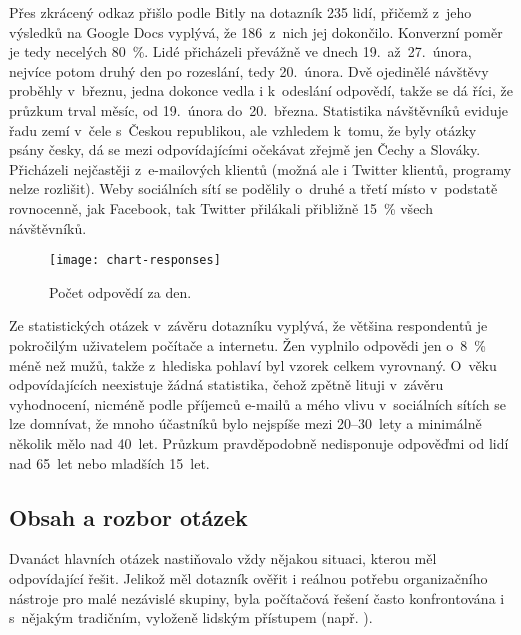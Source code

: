 \documentclass[12pt,oneside,final]{fithesis2}
\begin{document}
Přes zkrácený odkaz přišlo podle Bitly na dotazník 235 lidí, přičemž z~jeho výsledků na Google Docs vyplývá, že 186~z~nich jej dokončilo. Konverzní poměr je tedy necelých 80~\%. Lidé přicházeli převážně ve dnech 19.~až~27.~února, nejvíce potom druhý den po rozeslání, tedy 20.~února. Dvě ojedinělé návštěvy proběhly v~březnu, jedna dokonce vedla i k~odeslání odpovědí, takže se dá říci, že průzkum trval měsíc, od 19.~února do~20.~března. Statistika návštěvníků eviduje řadu zemí v~čele s~Českou republikou, ale vzhledem k~tomu, že byly otázky psány česky, dá se mezi odpovídajícími očekávat zřejmě jen Čechy a Slováky. Přicházeli nejčastěji z~e-mailových klientů (možná ale i Twitter klientů, programy nelze rozlišit). Weby sociálních sítí se podělily o~druhé a třetí místo v~podstatě rovnocenně, jak Facebook, tak Twitter přilákali přibližně 15~\% všech návštěvníků.

\begin{figure}[h]
    \centering
    \texttt{[image: chart-responses]}
    \caption{Počet odpovědí za den.}
\end{figure}

Ze statistických otázek v~závěru dotazníku vyplývá, že většina respondentů je pokročilým uživatelem počítače a internetu. Žen vyplnilo odpovědi jen o~8~\% méně než mužů, takže z~hlediska pohlaví byl vzorek celkem vyrovnaný. O~věku odpovídajících neexistuje žádná statistika, čehož zpětně lituji v~závěru vyhodnocení, nicméně podle příjemců e-mailů a mého vlivu v~sociálních sítích se lze domnívat, že mnoho účastníků bylo nejspíše mezi 20--30~lety a minimálně několik mělo nad 40~let. Průzkum pravděpodobně nedisponuje odpověďmi od lidí nad 65~let nebo mladších 15~let.

\subsection{Obsah a rozbor otázek}
Dvanáct hlavních otázek nastiňovalo vždy nějakou situaci, kterou měl odpovídající řešit. Jelikož měl dotazník ověřit i reálnou potřebu organizačního nástroje pro malé nezávislé skupiny, byla počítačová řešení často konfrontována i s~nějakým tradičním, vyloženě lidským přístupem (např. ).
\end{document}
